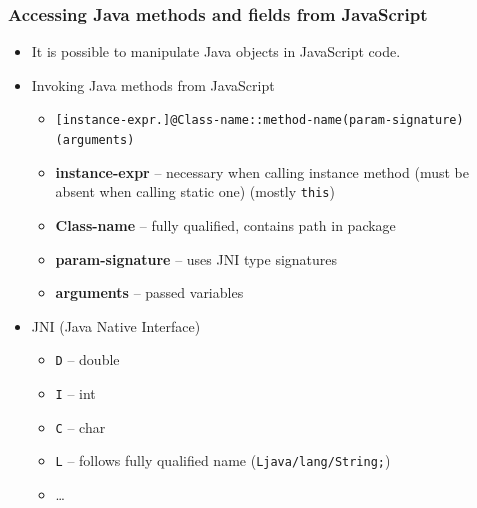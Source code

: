 \documentclass[10pt,table, xcolor=pdflatex]{beamer}
\begin{document}
\begin{frame}[fragile]\frametitle{\normalsize{Accessing Java methods and fields from JavaScript}}
	\begin{itemize}
		\item It is possible to manipulate Java objects in JavaScript code.
		\item Invoking Java methods from JavaScript
        \begin{itemize}
        	\footnotesize
        	\item[] \verb'[instance-expr.]@Class-name::method-name(param-signature)'
            \verb'(arguments)'\\[1em]
            \item \textbf{instance-expr} -- necessary when calling instance method (must be absent when calling static one) (mostly \texttt{this})
            \item \textbf{Class-name} -- fully qualified, contains path in package
            \item \textbf{param-signature} -- uses JNI type signatures
            \item \textbf{arguments} -- passed variables
            \normalsize
        \end{itemize}
     	\item JNI (Java Native Interface)
     	\begin{itemize}
        	\item \texttt{D} -- double
        	\item \texttt{I} -- int
        	\item \texttt{C} -- char
        	\item \texttt{L} -- follows fully qualified name (\texttt{Ljava/lang/String;})
        	\item \ldots
     	\end{itemize}
	\end{itemize}
\end{frame}
\end{document}
